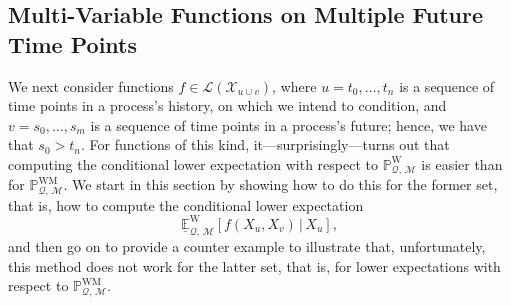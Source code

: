\documentclass[10pt,a4paper]{paper}
\theoremstyle{definition}
\newcommand{\states}{\mathcal{X}}
\newcommand{\processes}{\mathbb{P}}
\newcommand{\wprocesses}{\processes^{\mathrm{W}}}
\newcommand{\wmprocesses}{\processes^{\mathrm{WM}}}
\newcommand{\gambles}{\mathcal{L}}
\newcommand{\rateset}{\mathcal{Q}}
\begin{document}
\subsection{Multi-Variable Functions on Multiple Future Time Points}\label{sec:decomposition}

We next consider functions $f\in\gambles(\states_{u\cup v})$, where $u=t_0,\ldots,t_n$ is a sequence of time points in a process's history, on which we intend to condition, and $v=s_0,\ldots,s_m$ is a sequence of time points in a process's future; hence, we have that $s_0>t_n$. For functions of this kind, it---surprisingly---turns out that computing the conditional lower expectation with respect to $\wprocesses_{\rateset,\,\mathcal{M}}$ is easier than for $\wmprocesses_{\rateset,\,\mathcal{M}}$. We start in this section by showing how to do this for the former set, that is, how to compute the conditional lower expectation
\begin{equation}\label{eq:lowerexpmultipletimepoints}
\underline{\mathbb{E}}_{\rateset,\,\mathcal{M}}^{\mathrm{W}}[f(X_u,X_v)\,\vert\,X_u],
\end{equation}
and then go on to provide a counter example to illustrate that, unfortunately, this method does not work for the latter set, that is, for lower expectations with respect to $\wmprocesses_{\rateset,\,\mathcal{M}}$.
\end{document}

